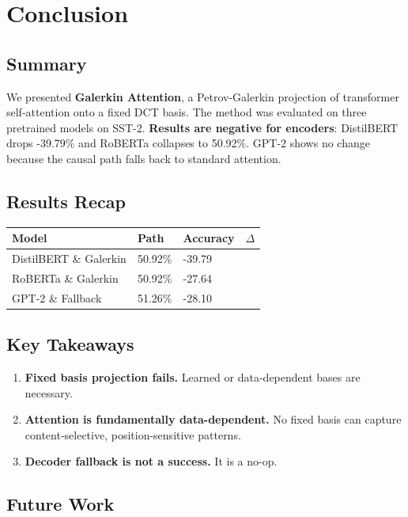 
\section{Conclusion}

\subsection{Summary}

We presented \textbf{Galerkin Attention}, a Petrov-Galerkin projection of 
transformer self-attention onto a fixed DCT basis. The method was evaluated 
on three pretrained models on SST-2. \textbf{Results are negative for encoders}: 
DistilBERT drops -39.79\% and RoBERTa collapses to 50.92\%. GPT-2 
shows no change because the causal path falls back to standard attention.

\subsection{Results Recap}

\begin{table}[H]
\centering
\small
\begin{tabular}{llll}
\toprule
\textbf{Model} & \textbf{Path} & \textbf{Accuracy} & \textbf{$\Delta$} \\
\midrule
DistilBERT \& Galerkin & 50.92\% & -39.79 \\
RoBERTa \& Galerkin & 50.92\% & -27.64 \\
GPT-2 \& Fallback & 51.26\% & -28.10 \\
\bottomrule
\end{tabular}
\end{table}

\subsection{Key Takeaways}

\begin{enumerate}
\item \textbf{Fixed basis projection fails.} Learned or data-dependent bases are
  necessary.
\item \textbf{Attention is fundamentally data-dependent.} No fixed basis can capture
  content-selective, position-sensitive patterns.
\item \textbf{Decoder fallback is not a success.} It is a no-op.

\end{enumerate}
\subsection{Future Work}

